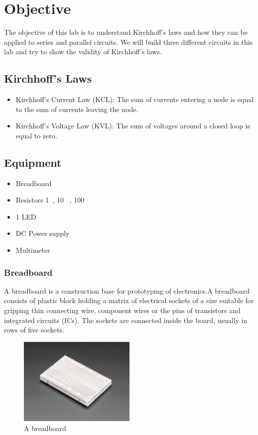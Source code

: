 \documentclass[a4paper, 10pt]{article}
\begin{document}
	\tableofcontents
	\pagebreak
	
	\listoffigures
	\pagebreak
	
	\section{Objective}
		The objective of this lab is to understand Kirchhoff's laws and how they can be applied to series and parallel circuits.
		We will build three different circuits in this lab and try to show the validity of Kirchhoff's laws.
		
		\subsection{Kirchhoff's Laws}
			\begin{itemize}
				\item Kirchhoff's Current Law (KCL): The sum of currents entering a node is equal to the sum of currents leaving the node.
				\item Kirchhoff's Voltage Law (KVL): The sum of voltages around a closed loop is equal to zero.
			\end{itemize}
	
		\subsection{Equipment}
			\begin{itemize}
				\item Breadboard
				\item Resistors 1\si{\kilo\Omega}, 10 \si{\kilo\Omega}, 100 \si{\Omega}
				\item 1 LED
				\item DC Power supply
				\item Multimeter
			\end{itemize}

			\subsubsection{Breadboard}
				A breadboard is a construction base for prototyping of electronics.A breadboard consists of plastic block holding a matrix of electrical sockets of a size suitable for gripping thin connecting wire, 
				component wires or the pins of transistors and integrated circuits (ICs). The sockets are connected inside the board, usually in rows of five sockets.

				\begin{figure}[h!]
					\centering
					\includegraphics[width=0.5\textwidth]{images/breadboard.jpeg}
					\caption{A breadboard}
					\label{fig:breadboard}
				\end{figure}
			
\end{document}
